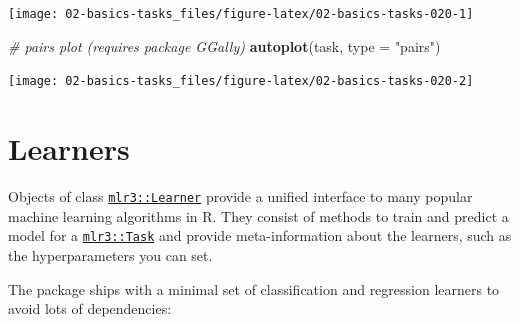 \documentclass[]{scrbook}
\newenvironment{Shaded}{\begin{snugshade}}{\end{snugshade}}
\newcommand{\CommentTok}[1]{\textcolor[rgb]{0.56,0.35,0.01}{\textit{#1}}}
\newcommand{\DataTypeTok}[1]{\textcolor[rgb]{0.13,0.29,0.53}{#1}}
\newcommand{\DecValTok}[1]{\textcolor[rgb]{0.00,0.00,0.81}{#1}}
\newcommand{\KeywordTok}[1]{\textcolor[rgb]{0.13,0.29,0.53}{\textbf{#1}}}
\newcommand{\NormalTok}[1]{#1}
\newcommand{\OperatorTok}[1]{\textcolor[rgb]{0.81,0.36,0.00}{\textbf{#1}}}
\newcommand{\StringTok}[1]{\textcolor[rgb]{0.31,0.60,0.02}{#1}}
\renewenvironment{Shaded} {\begin{snugshade}\small} {\end{snugshade}}
\begin{document}
\begin{Shaded}
\end{Shaded}

\begin{center}\texttt{[image: 02-basics-tasks\_files/figure-latex/02-basics-tasks-020-1]} \end{center}

\begin{Shaded}
\begin{Highlighting}[]
\CommentTok{# pairs plot (requires package GGally)}
\KeywordTok{autoplot}\NormalTok{(task, }\DataTypeTok{type =} \StringTok{"pairs"}\NormalTok{)}
\end{Highlighting}
\end{Shaded}

\begin{center}\texttt{[image: 02-basics-tasks\_files/figure-latex/02-basics-tasks-020-2]} \end{center}

\hypertarget{learners}{%
\section{Learners}\label{learners}}

Objects of class \href{https://mlr3.mlr-org.com/reference/Learner.html}{\texttt{mlr3::Learner}} provide a unified interface to many popular machine learning algorithms in R.
They consist of methods to train and predict a model for a \href{https://mlr3.mlr-org.com/reference/Task.html}{\texttt{mlr3::Task}} and provide meta-information about the learners, such as the hyperparameters you can set.

The package ships with a minimal set of classification and regression learners to avoid lots of dependencies:
\end{document}
